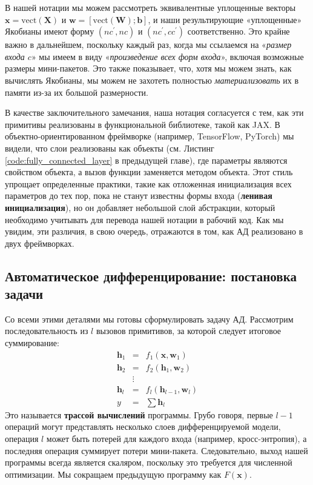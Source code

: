 В нашей нотации мы можем рассмотреть эквивалентные уплощенные векторы $\mathbf{x} = \text{vect}(\mathbf{X})$ и $\mathbf{w} = \left[\text{vect}(\mathbf{W}); \mathbf{b}\right]$, и наши результирующие «уплощенные» Якобианы имеют форму $(nc^\prime, nc)$ и $(nc^\prime, cc^\prime)$ соответственно. Это крайне важно в дальнейшем, поскольку каждый раз, когда мы ссылаемся на «\textit{размер входа $c$}» мы имеем в виду «\textit{произведение всех форм входа}», включая возможные размеры мини-пакетов. Это также показывает, что, хотя мы можем знать, как вычислять Якобианы, мы можем не захотеть полностью \textit{материализовать} их в памяти из-за их большой размерности.

В качестве заключительного замечания, наша нотация согласуется с тем, как эти примитивы реализованы в функциональной библиотеке, такой как JAX. В объектно-ориентированном фреймворке (например, TensorFlow, PyTorch) мы видели,
что слои реализованы как объекты (см. Листинг \ref{code:fully_connected_layer} в предыдущей главе), где параметры являются свойством объекта, а вызов функции заменяется методом объекта. Этот стиль упрощает определенные практики, такие как отложенная инициализация всех параметров до тех пор, пока не станут известны формы входа (\textbf{ленивая инициализация}), но он добавляет небольшой слой абстракции, который необходимо учитывать для перевода нашей нотации в рабочий код. Как мы увидим, эти различия, в свою очередь, отражаются в том, как АД реализовано в двух фреймворках.

\subsection{Автоматическое дифференцирование: постановка задачи}

Со всеми этими деталями мы готовы сформулировать задачу АД. Рассмотрим последовательность из $l$ вызовов примитивов, за которой следует итоговое суммирование:
%
\begin{eqnarray*}
\mathbf{h}_1 & = & f_1(\mathbf{x}, \mathbf{w}_1) \\
\mathbf{h}_2 & = & f_2(\mathbf{h}_1, \mathbf{w}_2) \\
& \vdots &  \\
\mathbf{h}_{l} & = & f_{l}(\mathbf{h}_{l-1}, \mathbf{w}_{l}) \\
y & = & \sum \mathbf{h}_{l} 
\end{eqnarray*}
%
Это называется \textbf{трассой вычислений} программы. Грубо говоря, первые $l-1$ операций могут представлять несколько слоев дифференцируемой модели, операция $l$ может быть потерей для каждого входа (например, кросс-энтропия), а последняя операция суммирует потери мини-пакета. Следовательно, выход нашей программы всегда является скаляром, поскольку это требуется для численной оптимизации. Мы сокращаем предыдущую программу как $F(\mathbf{x})$. 

